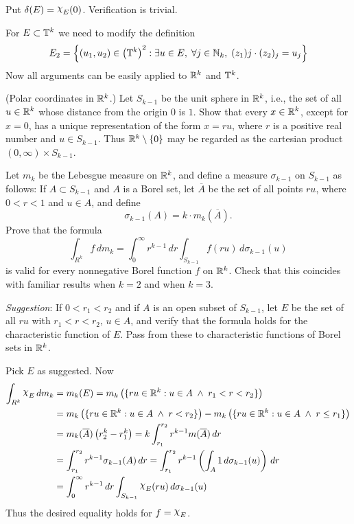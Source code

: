 \begin{enumerate}
\begin{itemize}
Put \(\delta(E) = \chhi_E(0)\). Verification is trivial.

For \(E\subset \mathbb{T}^k\) we need to modify the definition 
\begin{equation*}
E_2 = \left\{(u_1,u_2)\in \left(\mathbb{T}^k\right)^2: \exists u\in E,\;
         \forall j\in\mathbb{N}_k,\; (z_1)j\cdot(z_2)_j = u_j\right\}
\end{equation*}
Now all arguments can be easily applied to \(\mathbb{R}^k\) and \(\mathbb{T}^k\).
\end{itemize}


\begin{excopy}
(Polar coordinates in \(\mathbb{R}^k\).)
Let \(S_{k-1}\) be the unit sphere in \(\mathbb{R}^k\), 
i.e., the set of all \(u \in \mathbb{R}^k\) whose distance from the origin $0$ is $1$.
Show that every \(x\in \mathbb{R}^k\), except for \(x=0\), has a unique representation
of the form \(x=ru\), where $r$ is a positive real number and \(u\in S_{k-1}\).
Thus \(\mathbb{R}^k\setminus\{0\}\) may be regarded as the cartesian product
\((0,\infty)\times S_{k-1}\).

Let \(m_k\) be the Lebesgue measure on \(\mathbb{R}^k\), and define a measure
\(\sigma_{k-1}\) on \(S_{k-1}\) as follows:
If \(A \subset S_{k-1}\) and $A$ is a Borel set, let \(\overline{A}\)
be the set of all points \(ru\), where \(0 < r < 1\)
and \(u\in A\), and define
\begin{equation*}
\sigma_{k-1}(A) = k \cdot m_k(\overline{A}).
\end{equation*}
Prove that the formula
\begin{equation*}
\int_{R^k} f\,dm_k 
= \int_0^\infty r^{k-1}\,dr \int_{S_{k-1}} f(ru)\,d\sigma_{k-1}(u)
\end{equation*}
is valid for every nonnegative Borel function $f$ on \(\mathbb{R}^{k}\).
Check that this coincides with familiar results 
when \(k=2\)
and when \(k=3\).

\emph{Suggestion}: If \(0 < r_1 < r_2\) and if $A$ 
is an open subset of \(S_{k-1}\), let $E$ be the set of all \(ru\) with
\(r_1 < r < r_2\), \(u\in A\),
and verify that the formula holds for the characteristic function of $E$.
Pass from these to characteristic functions of Borel sets in \(\mathbb{R}^k\).
\end{excopy}

Pick $E$ as suggested. Now
\begin{align*}
\int_{R^k} \chhi_E\,dm_k 
&= m_k(E) 
 = m_k\left(\{ru\in \R^k: u\in A\;\wedge\; r_1<r<r_2\}\right) \\
&=   m_k\left(\{ru\in \R^k: u\in A\;\wedge\; r<r_2\}\right)
   - m_k\left(\{ru\in \R^k: u\in A\;\wedge\; r\leq r_1\}\right) \\
&= m_k(\overline{A})\left(r_2^k - r_1^k\right)
 = k\int_{r_1}^{r_2} r^{k-1}m(\overline{A})\,dr \\
&= \int_{r_1}^{r_2} r^{k-1}\sigma_{k-1}(A)\,dr
 = \int_{r_1}^{r_2} r^{k-1}\left(\int_A 1\,d\sigma_{k-1}(u)\right)\,dr \\
&= \int_0^\infty r^{k-1}\,dr \int_{S_{k-1}} \chhi_E(ru)\,d\sigma_{k-1}(u)
\end{align*}
Thus the desired equality holds for \(f=\chhi_E\).


\end{enumerate}
